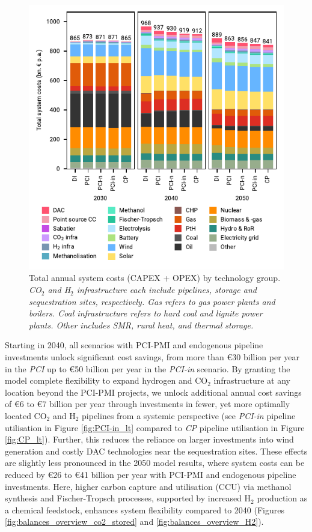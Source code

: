 \documentclass[pdflatex,sn-nature]{sn-jnl}%
\theoremstyle{thmstyleone}%
\theoremstyle{thmstyletwo}%
\theoremstyle{thmstylethree}%
\begin{document}
\begin{figure}[t]
  \centering
  \includegraphics{figures/costs_overview}
  \caption{Total annual system costs (CAPEX + OPEX) by technology group. \textit{CO$_2$ and H$_2$ infrastructure each include pipelines, storage and sequestration sites, respectively. Gas refers to gas power plants and boilers. Coal infrastructure refers to hard coal and lignite power plants. Other includes SMR, rural heat, and thermal storage.}}
  \label{fig:costs_overview}
\end{figure}

Starting in 2040, all scenarios with PCI-PMI and endogenous pipeline investments unlock significant cost savings, from more than €30 billion per year in the \textit{PCI} up to €50 billion per year in the \textit{PCI-in} scenario. 
By granting the model complete flexibility to expand hydrogen and CO$_2$ infrastructure at any location beyond the PCI-PMI projects, we unlock additional annual cost savings of €6 to €7 billion per year through investments in fewer, yet more optimally located CO$_2$ and H$_2$ pipelines from a systemic perspective (see \textit{PCI-in} pipeline utilisation in Figure \ref{fig:PCI-in_lt} compared to \textit{CP} pipeline utilisation in Figure \ref{fig:CP_lt}).
Further, this reduces the reliance on larger investments into wind generation and costly DAC technologies near the sequestration sites. These effects are slightly less pronounced in the 2050 model results, where system costs can be reduced by €26 to €41 billion per year with PCI-PMI and endogenous pipeline investments. Here, higher carbon capture and utilisation (CCU) via methanol synthesis and Fischer-Tropsch processes, supported by increased H$_2$ production as a chemical feedstock, enhances system flexibility compared to 2040 (Figures \ref{fig:balances_overview_co2_stored} and \ref{fig:balances_overview_H2}).
\end{document}
